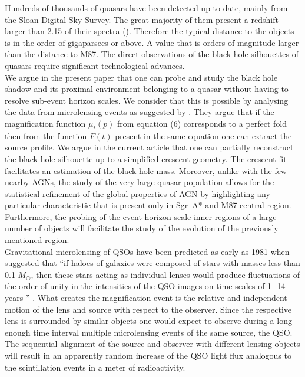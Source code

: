 Hundreds of thousands of quasars have been detected up to date, mainly from the Sloan Digital Sky Survey. The great majority of them present a redshift larger than 2.15 of their spectra (\citep{2014A&A...563A..54P}). 
Therefore the typical distance to the objects is in the order of gigaparsecs or above. 
A value that is orders of magnitude larger than the distance to M87. The direct observations of the black hole silhouettes of quasars require significant technological advances.\\

We argue in the present paper that one can probe and study the black hole shadow and its proximal environment belonging to a quasar without having to resolve sub-event horizon scales. 
We consider that this is possible by analysing the data from microlensing-events as suggested by \cite{1999ApJ...524...49A}. They argue that if the magnification function $\mu_t(p)$ from equation (6) corresponds to a perfect fold then from the function $F(t)$ present in the same equation one can extract the source profile. We argue in the current article that one can partially 
reconstruct the black hole silhouette up to a simplified crescent geometry. The crescent fit facilitates an estimation of the black hole mass.       
Moreover, unlike with the few nearby AGNs, the study of the very large quasar population allows for the statistical refinement of the global properties of AGN by highlighting any particular
characteristic that is present only in Sgr~A* and M87 central region. 
Furthermore, the probing of the event-horizon-scale inner regions of a large number of objects will facilitate the study of the evolution of the previously mentioned region. \\     
     
Gravitational microlensing of QSOs have been predicted as early as 1981 when \cite{1981ApJ...243..140G} suggested that 
``if haloes of galaxies were composed of stars with masses less than  0.1 $M_\odot$, then these stars acting as individual lenses would produce fluctuations of the order of 
unity in the intensities of the QSO images on time scales of 1 -14 years '' . 
What creates the magnification event is the relative and independent motion of the lens and source with respect to the observer.
Since the respective lens is surrounded by similar objects one would expect to observe during a long enough time interval
multiple microlensing events of the same source, the QSO. 
The sequential alignment of the source and observer with different lensing objects will result in an apparently random increase of the QSO light flux analogous to the scintillation events in a meter of radioactivity.\\

